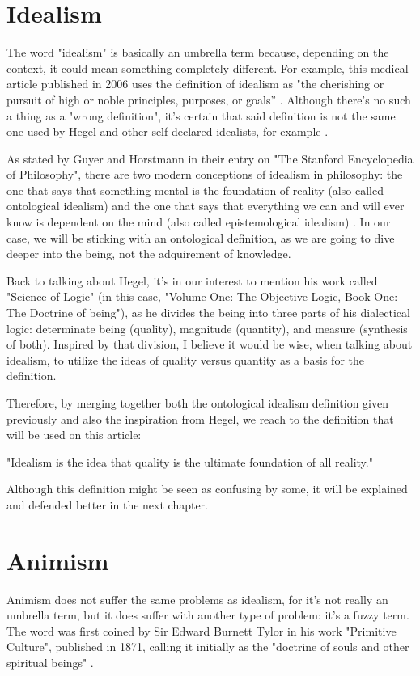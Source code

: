 \section{Idealism}
The word "idealism" is basically an umbrella term because, depending on the context, it could mean
something completely different. For example, this medical article published in 2006 uses the
definition of idealism as "the cherishing or pursuit of high or noble principles, purposes, or
goals” \cite{Smith2006}. Although there's no such a thing as a "wrong definition", it's certain
that said definition is not the same one used by Hegel and other self-declared idealists, for
example \cite{Beiser2009}.

As stated by Guyer and Horstmann in their entry on "The Stanford Encyclopedia of Philosophy",
there are two modern conceptions of idealism in philosophy: the one that says that something
mental is the foundation of reality (also called ontological idealism) and the one that says
that everything we can and will ever know is dependent on the mind (also called epistemological
idealism) \cite{Guyer2023}. In our case, we will be sticking with an ontological definition, as
we are going to dive deeper into the being, not the adquirement of knowledge.

Back to talking about Hegel, it's in our interest to mention his work called "Science of Logic"
(in this case, "Volume One: The Objective Logic, Book One: The Doctrine of being"), as he divides the
being into three parts of his dialectical logic: determinate being (quality), magnitude (quantity),
and measure (synthesis of both). Inspired by that division, I believe it would be wise, when talking
about idealism, to utilize the ideas of quality versus quantity as a basis for the definition.

Therefore, by merging together both the ontological idealism definition given previously and also
the inspiration from Hegel, we reach to the definition that will be used on this article:

\begin{center}
    \itshape
    \parbox{0.7\textwidth}{
    "Idealism is the idea that quality is the ultimate foundation of all reality." 
    }
\end{center}

Although this definition might be seen as confusing by some, it will be explained and defended better
in the next chapter.

\section{Animism}
Animism does not suffer the same problems as idealism, for it's not really an umbrella term, but it does
suffer with another type of problem: it's a fuzzy term. The word was first coined by Sir Edward Burnett
Tylor in his work "Primitive Culture", published in 1871, calling it initially as the "doctrine of souls
and other spiritual beings" \cite{Tylor1871}.

